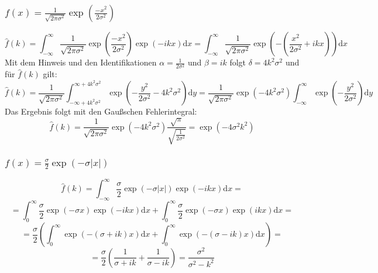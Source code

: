 \documentclass[a4paper,11pt]{article}
\begin{document}
\subsubsection{$f(x) = \frac{1}{\sqrt{2\pi\sigma^2}}\exp(\frac{-x^2}{2\sigma^2})$}
\begin{equation}
        \hat{f}(k) = \int_{-\infty}^\infty \frac{1}{\sqrt{2\pi\sigma^2}}\exp(\frac{-x^2}{2\sigma^2}) \exp(-ikx)\text{d}x = \int_{-\infty}^\infty \frac{1}{\sqrt{2\pi\sigma^2}}\exp(-(\frac{x^2}{2\sigma^2} + ikx))\text{d}x
\end{equation}
Mit dem Hinweis und den Identifikationen $\alpha = \frac{1}{2\sigma^2}$ und $\beta = ik$ folgt $\delta = 4k^2\sigma^2$ und für $\hat{f}(k)$ gilt:
\begin{equation}
        \hat{f}(k) = \frac{1}{\sqrt{2\pi\sigma^2}}\int_{-\infty + 4k^2\sigma^2}^{\infty + 4k^2\sigma^2} \exp(-\frac{y^2}{2\sigma^2} - 4k^2\sigma^2)\text{d}y = \frac{1}{\sqrt{2\pi\sigma^2}}\exp(-4k^2\sigma^2)\int_{-\infty}^{\infty} \exp(-\frac{y^2}{2\sigma^2})\text{d}y
\end{equation}
Das Ergebnis folgt mit den Gaußschen Fehlerintegral:
\begin{equation}
        \hat{f}(k) = \frac{1}{\sqrt{2\pi\sigma^2}}\exp(-4k^2\sigma^2) \frac{\sqrt{\pi}}{\sqrt{\frac{1}{2\sigma^2}}} = \exp(-4\sigma^2k^2)
\end{equation}

\subsubsection{$f(x) = \frac{\sigma}{2}\exp(-\sigma|x|)$}

\begin{equation}
        \hat{f}(k) = \int_{-\infty}^\infty \frac{\sigma}{2}\exp(-\sigma|x|) \exp(-ikx)\text{d}x = 
\end{equation}
\begin{equation}
        = \int_0^\infty\frac{\sigma}{2}\exp(-\sigma x) \exp(-ikx)\text{d}x + \int_0^\infty\frac{\sigma}{2}\exp(-\sigma x) \exp(ikx)\text{d}x = 
\end{equation}
\begin{equation}
        = \frac{\sigma}{2} (\int_0^\infty\exp(-(\sigma + ik)x)\text{d}x + \int_0^\infty\exp(-(\sigma - ik)x)\text{d}x) = 
\end{equation}
\begin{equation}
        = \frac{\sigma}{2} (\frac{1}{\sigma + ik} + \frac{1}{\sigma - ik}) = \frac{\sigma^2}{\sigma^2 - k^2}
\end{equation}
\end{document}
